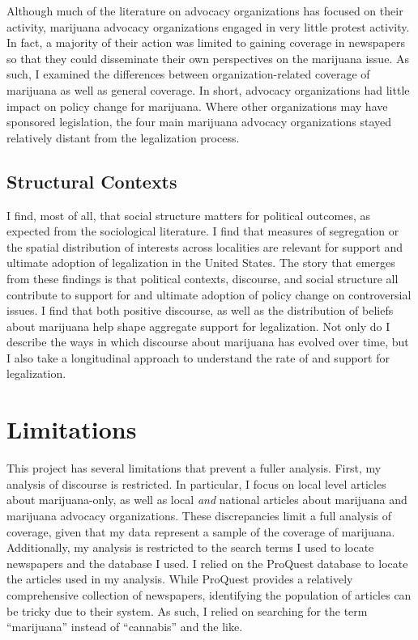 Although much of the literature on advocacy organizations has focused on their activity, marijuana advocacy organizations engaged in very little protest activity. In fact, a majority of their action was limited to gaining coverage in newspapers so that they could disseminate their own perspectives on the marijuana issue. As such, I examined the differences between organization-related coverage of marijuana as well as general coverage. In short, advocacy organizations had little impact on policy change for marijuana. Where other organizations may have sponsored legislation, the four main marijuana advocacy organizations stayed relatively distant from the legalization process. 


\subsection{Structural Contexts}

I find, most of all, that social structure matters for political outcomes, as expected from the sociological literature. I find that measures of segregation or the spatial distribution of interests across localities are relevant for support and ultimate adoption of legalization in the United States. The story that emerges from these findings is that political contexts, discourse, and social structure all contribute to support for and ultimate adoption of policy change on controversial issues. I find that both positive discourse, as well as the distribution of beliefs about marijuana help shape aggregate support for legalization. Not only do I describe the ways in which discourse about marijuana has evolved over time, but I also take a longitudinal approach to understand the rate of and support for legalization. 

\section{Limitations}

This project has several limitations that prevent a fuller analysis. First, my analysis of discourse is restricted. In particular, I focus on local level articles about marijuana-only, as well as local \textit{and} national articles about marijuana and marijuana advocacy organizations. These discrepancies limit a full analysis of coverage, given that my data represent a sample of the coverage of marijuana. Additionally, my analysis is restricted to the search terms I used to locate newspapers and the database I used. I relied on the ProQuest database to locate the articles used in my analysis. While ProQuest provides a relatively comprehensive collection of newspapers, identifying the population of articles can be tricky due to their system. As such, I relied on searching for the term ``marijuana'' instead of ``cannabis'' and the like. 

